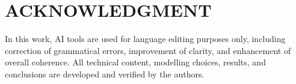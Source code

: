 \documentclass{ieee-ojvt}
\begin{document}
\section*{ACKNOWLEDGMENT}
In this work, AI tools are used for language editing purposes only, including correction
of grammatical errors, improvement of clarity, and enhancement of overall coherence. All
technical content, modelling choices, results, and conclusions are developed and verified
by the authors.



\end{document}
